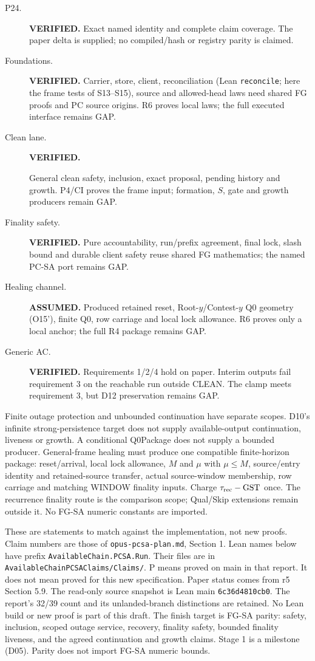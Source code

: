 \documentclass{article}
\newcommand{\nm}[1]{\nolinkurl{#1}}
\begin{document}
\begin{description}
\item[P24.] \textbf{VERIFIED.} Exact named identity and complete claim coverage.
The paper delta is supplied; no compiled/hash or registry parity is
claimed.
\item[Foundations.] \textbf{VERIFIED.} Carrier, store, client, reconciliation (Lean \nm{reconcile}; here the frame tests of S13--S15), source and
allowed-head laws need shared FG proofs and PC source origins. R6 proves
local laws; the full executed interface remains GAP.
\item[Clean lane.] \textbf{VERIFIED.}\par General clean safety, inclusion, exact
proposal, pending history and growth. P4/CI proves the frame input;
formation, $S$, gate and growth producers remain GAP.
\item[Finality safety.] \textbf{VERIFIED.} Pure accountability, run/prefix
agreement, final lock, slash bound and durable client safety reuse shared
FG mathematics; the named PC-SA port remains GAP.
\item[Healing channel.] \textbf{ASSUMED.} Produced retained reset, Root-$y$/Contest-$y$
Q0 geometry (O15'), finite Q0, row carriage and local lock allowance. R6 proves
only a local anchor; the full R4 package remains GAP.
\item[Generic AC.] \textbf{VERIFIED.} Requirements 1/2/4 hold on paper. Interim
outputs fail requirement 3 on the reachable run outside CLEAN. The clamp
meets requirement 3, but D12 preservation remains GAP.
\end{description}
Finite outage protection and unbounded continuation have separate scopes.
D10's infinite strong-persistence target does not supply available-output
continuation, liveness or growth. A conditional Q0Package does not supply
a bounded producer. General-frame healing must produce one compatible
finite-horizon package: reset/arrival, local lock allowance, $M$ and $\mu$
with $\mu\leq M$, source/entry identity and retained-source transfer,
actual source-window membership, row carriage and matching WINDOW
finality inputs. Charge $\tau_{\rm rec}-\mathrm{GST}$ once. The recurrence
finality route is the comparison scope; Qual/Skip extensions remain
outside it. No FG-SA numeric constants are imported.

These are statements to match against the implementation, not new proofs.
Claim numbers are those of \nm{opus-pcsa-plan.md}, Section 1.
Lean names below have prefix \nm{AvailableChain.PCSA.Run}.
Their files are in \nm{AvailableChainPCSAClaims/Claims/}.
P means proved on main in that report. It does not mean proved for this
new specification. Paper status comes from r5 Section 5.9.
The read-only source snapshot is Lean main \nm{6c36d4810cb0}.
The report's 32/39 count and its unlanded-branch distinctions are retained.
No Lean build or new proof is part of this draft.
The finish target is FG-SA parity: safety, inclusion, scoped outage service,
recovery, finality safety, bounded finality liveness, and the agreed
continuation and growth claims. Stage 1 is a milestone (D05). Parity does
not import FG-SA numeric bounds.
\end{document}

